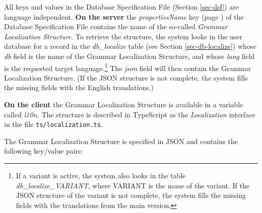\documentclass[11pt,oneside,a4paper]{memoir}
\begin{document}
All keys and values in the Database Specification File (Section \ref{sec-dsf}) are language
independent. \textbf{On the server} the \emph{propertiesName} key (page \pageref{propname}) of the
Database Specification File contains the name of the so-called \emph{Grammar Localization
  Structure}. To retrieve the structure, the system looks in the user database for a record in the
\emph{db\_localize} table (see Section \ref{sec-db-localize}) whose \emph{db} field is the name of
the Grammar Localization Structure, and whose \emph{lang} field is the requested target
language.\footnote{If a variant is active, the system also looks in the table
  \emph{db\_localize\_VARIANT}, where VARIANT is the name of the variant. If the JSON structure of
  the variant is not complete, the system fills the missing fields with the translations from the
  main version.}
The \emph{json} field will then contain the Grammar Localization Structure. (If the JSON structure
is not complete, the system fills the missing fields with the English translations.)

\textbf{On the client} the Grammar Localization Structure is available in a
variable called \emph{l10n.}%
The structure is described in TypeScript as the \emph{Localization} interface%
 in the file \texttt{ts/localization.ts}.

The Grammar Localization Structure is specified in JSON and contains the following key/value pairs:
\end{document}
